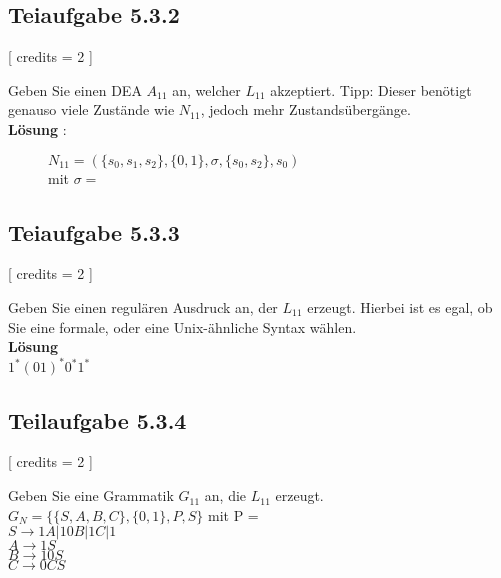 \documentclass[12pt]{article}
\begin{document}
  
  
  
 \subsection*{Teiaufgabe 5.3.2} [
 credits = 2 
 ] 
  
 Geben Sie einen DEA $A_{11}$ an, welcher $L_{11}$ akzeptiert. Tipp: Dieser benötigt genauso viele Zustände wie $N_{11}$, jedoch mehr Zustandsübergänge. \\
 \textbf{Lösung} :   
 \begin{figure}[h] 
   $N_{11} = (\{s_0,s_1,s_2\},\{0,1\},\sigma,\{s_0,s_2\},s_0)$ \\ mit $\sigma =$ \\

 \centering 
  
 \end{figure} 
  
  
  
  
 \subsection*{Teiaufgabe 5.3.3} [
 credits = 2 
 ] 
  
 Geben Sie einen regulären Ausdruck an, der $L_{11}$ erzeugt. Hierbei ist es egal, ob Sie eine formale, oder eine Unix-ähnliche Syntax wählen.  \\
  \textbf{Lösung}\\
  $1^*(01)^*0^*1^*$
  
  
 \subsection*{Teilaufgabe 5.3.4} [
 credits = 2 
 ] 
  
 Geben Sie eine Grammatik $G_{11}$ an, die $L_{11}$ erzeugt.  \\
  $G_N = \{\{S,A,B,C\},\{0,1\},P,S\}$ mit P =\\
 $S \rightarrow 1A|10B|1C|1$\\
 $A \rightarrow 1S$\\
 $B \rightarrow 10S$\\
 $C \rightarrow 0CS$
 
\end{document}
